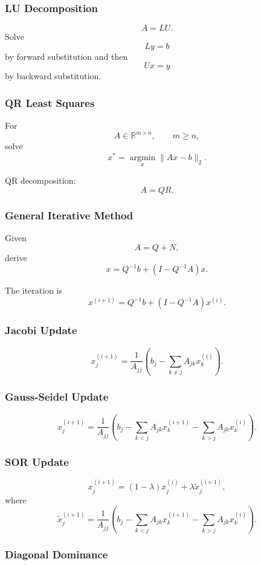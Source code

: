 \documentclass[10pt, letterpaper]{article}
\newcommand{\R}{\mathbb{R}}
\begin{document}
\subsubsection{LU Decomposition}

\[
A=LU.
\]
Solve
\[
Ly=b
\]
by forward substitution and then
\[
Ux=y
\]
by backward substitution.

\subsubsection{QR Least Squares}

For
\[
A\in\R^{m\times n},
\qquad
m\geq n,
\]
solve
\[
x^\ast
=
\operatorname*{argmin}_x \|Ax-b\|_2.
\]

QR decomposition:
\[
A=QR.
\]

\subsubsection{General Iterative Method}

Given
\[
A=Q+N,
\]
derive
\[
x
=
Q^{-1}b+(I-Q^{-1}A)x.
\]

The iteration is
\[
x^{(i+1)}
=
Q^{-1}b+(I-Q^{-1}A)x^{(i)}.
\]

\subsubsection{Jacobi Update}

\[
x_j^{(i+1)}
=
\frac{1}{A_{jj}}
\left(
b_j-\sum_{k\neq j}A_{jk}x_k^{(i)}
\right).
\]

\subsubsection{Gauss-Seidel Update}

\[
x_j^{(i+1)}
=
\frac{1}{A_{jj}}
\left(
b_j
-
\sum_{k<j}A_{jk}x_k^{(i+1)}
-
\sum_{k>j}A_{jk}x_k^{(i)}
\right).
\]

\subsubsection{SOR Update}

\[
x_j^{(i+1)}
=
(1-\lambda)x_j^{(i)}
+
\lambda \widetilde{x}_j^{(i+1)},
\]
where
\[
\widetilde{x}_j^{(i+1)}
=
\frac{1}{A_{jj}}
\left(
b_j
-
\sum_{k<j}A_{jk}x_k^{(i+1)}
-
\sum_{k>j}A_{jk}x_k^{(i)}
\right).
\]

\subsubsection{Diagonal Dominance}
\end{document}
